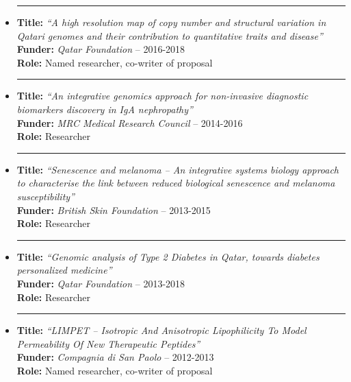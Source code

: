 \documentclass[a4paper,10pt]{article}
\newcommand{\noitem}{\item[]}
\begin{document}
\begin{itemize}[leftmargin=*,itemsep=1.2ex]
	\noitem\rule{1mm}{0pt}  \begin{minipage}[t]{0.94\textwidth}
		\textbf{Title:} \emph{``A high resolution map of copy number and structural variation in Qatari genomes and their contribution to quantitative traits and disease''}\\
		\textbf{Funder:} \emph{Qatar Foundation} -- 2016-2018\\
		\textbf{Role:} Named researcher, co-writer of proposal
	\end{minipage}
	
	\noitem\rule{1mm}{0pt}  \begin{minipage}[t]{0.94\textwidth}
		\textbf{Title:} \emph{``An integrative genomics approach for non-invasive diagnostic biomarkers discovery in IgA nephropathy''}\\
		\textbf{Funder:} \emph{MRC Medical Research Council} -- 2014-2016\\
		\textbf{Role:} Researcher
	\end{minipage}
	
	\noitem\rule{1mm}{0pt}  \begin{minipage}[t]{0.94\textwidth}
		\textbf{Title:} \emph{``Senescence and melanoma -- An integrative systems biology approach to characterise the link between reduced biological senescence and melanoma susceptibility''}\\
		\textbf{Funder:} \emph{British Skin Foundation} -- 2013-2015\\
		\textbf{Role:} Researcher
	\end{minipage}
		
	\noitem\rule{1mm}{0pt}  \begin{minipage}[t]{0.94\textwidth}
		\textbf{Title:} \emph{``Genomic analysis of Type 2 Diabetes in Qatar, towards diabetes personalized medicine''}\\
		\textbf{Funder:} \emph{Qatar Foundation} -- 2013-2018\\
		\textbf{Role:} Researcher
	\end{minipage}
	
	\noitem\rule{1mm}{0pt}  \begin{minipage}[t]{0.94\textwidth}
		\textbf{Title:} \emph{``LIMPET -- Isotropic And Anisotropic Lipophilicity To Model Permeability Of New Therapeutic Peptides''}\\
		\textbf{Funder:} \emph{Compagnia di San Paolo} -- 2012-2013\\
		\textbf{Role:} Named researcher, co-writer of proposal
	\end{minipage}	


\end{itemize}
\end{document}
